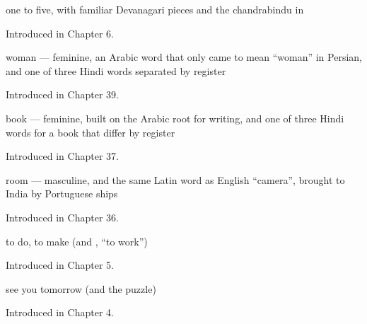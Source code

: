 \noindent\begin{minipage}[t]{\linewidth}
\raggedright
\textbf{    }\par
\small one to five, with familiar Devanagari pieces and the chandrabindu in \par
\footnotesize Introduced in Chapter 6.
\end{minipage}\par\medskip

\noindent\begin{minipage}[t]{\linewidth}
\raggedright
\textbf{}\par
\small woman — feminine, an Arabic word that only came to mean \textquotedblleft{}woman\textquotedblright{} in Persian, and one of three Hindi words separated by register\par
\footnotesize Introduced in Chapter 39.
\end{minipage}\par\medskip

\noindent\begin{minipage}[t]{\linewidth}
\raggedright
\textbf{}\par
\small book — feminine, built on the Arabic root for writing, and one of three Hindi words for a book that differ by register\par
\footnotesize Introduced in Chapter 37.
\end{minipage}\par\medskip

\noindent\begin{minipage}[t]{\linewidth}
\raggedright
\textbf{}\par
\small room — masculine, and the same Latin word as English \textquotedblleft{}camera\textquotedblright{}, brought to India by Portuguese ships\par
\footnotesize Introduced in Chapter 36.
\end{minipage}\par\medskip

\noindent\begin{minipage}[t]{\linewidth}
\raggedright
\textbf{}\par
\small to do, to make (and  , \textquotedblleft{}to work\textquotedblright{})\par
\footnotesize Introduced in Chapter 5.
\end{minipage}\par\medskip

\noindent\begin{minipage}[t]{\linewidth}
\raggedright
\textbf{  }\par
\small see you tomorrow (and the  puzzle)\par
\footnotesize Introduced in Chapter 4.
\end{minipage}\par\medskip

